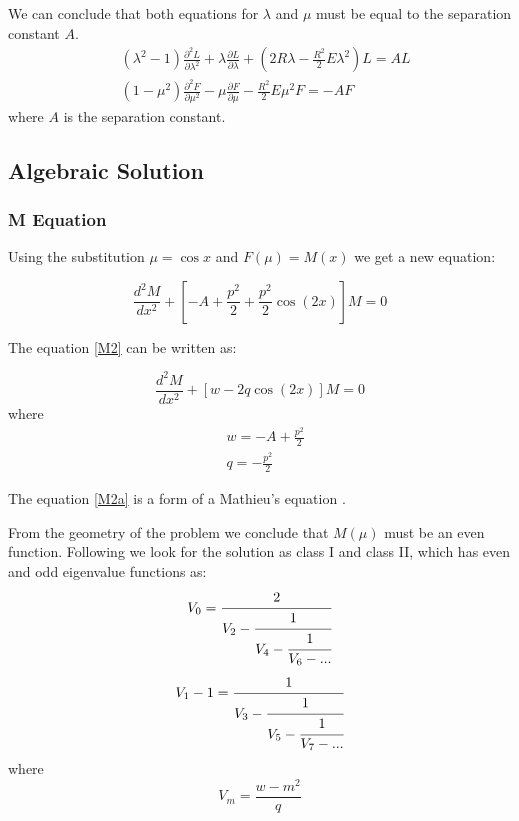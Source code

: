 We can conclude that both equations for $ \lambda $ and $ \mu $ must be equal to the separation constant $ A $. 
\begin{equation}\label{eqLG3}
\begin{split}
& (\lambda^2-1)\frac{\partial^2 L}{\partial \lambda^2} + \lambda\frac{\partial L}{\partial \lambda} + \left(2R\lambda -  \frac{R^2}{2} E\lambda^2\right) L = AL \\[.8em]
& (1 - \mu^2)\frac{\partial^2 F}{\partial \mu^2} - \mu\frac{\partial F}{\partial \mu} - \frac{R^2}{2} E \mu^2 F = -AF
\end{split}
\end{equation}
where $ A $ is the separation constant.

\subsection{Algebraic Solution}

\subsubsection{M Equation}

Using the substitution $ \mu  = \cos x$ and $ F(\mu) = M(x) $ we get a new equation:

\begin{equation}\label{M2}
\frac{d^2 M}{d x^2} + \left[-A + \frac{p^2}{2} + \frac{p^2}{2}\cos(2x) \right]M = 0 
\end{equation}

The equation \eqref{M2} can be written as:

\begin{equation}\label{M2a}
\frac{d^2 M}{d x^2} + \left[w - 2q\cos(2x)\right]M = 0
\end{equation}
where
\begin{equation}
\begin{split}
& w = - A + \frac{p^2}{2} \\[.7em]
& q = - \frac{p^2}{2}
\end{split}
\end{equation}

The equation \eqref{M2a} is a form of a  Mathieu's equation \cite{Mathieu2}. 

From the geometry of the problem we conclude that $ M(\mu) $ must be an even function.  Following \cite{Mathieu4} we look for the solution as class I and class II, which has even and odd eigenvalue functions as:
\begin{equation}
\begin{split}
V_0 = \cfrac{2}{V_2 - \cfrac{1}{V_4 - \cfrac{1}{V_6 - ...}}}\label{V-1-1}
\end{split}
\end{equation}
\begin{equation}
\begin{split}
V_1 - 1 = \cfrac{1}{V_3 - \cfrac{1}{V_5 - \cfrac{1}{V_7 - ...}}}\label{V-1-2}
\end{split}
\end{equation}
where 
\begin{equation}
V_m = \frac{w - m^2}{q}
\end{equation}

